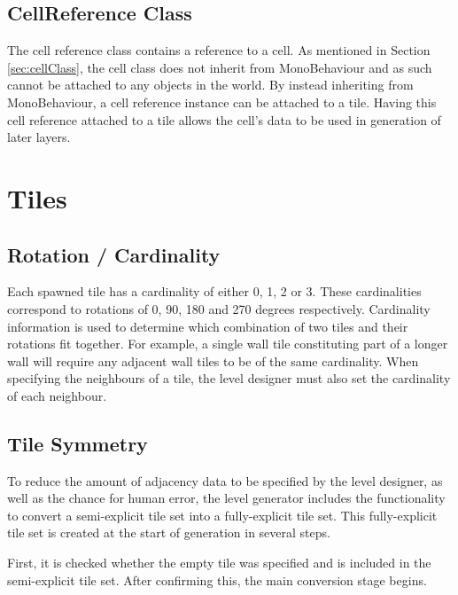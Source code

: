 
\subsection{CellReference Class}\label{sec:cellReferenceClass}
The cell reference class contains a reference to a cell. As mentioned in Section \ref{sec:cellClass}, the cell class does not inherit from MonoBehaviour and as such cannot be attached to any objects in the world. By instead inheriting from MonoBehaviour, a cell reference instance can be attached to a tile. Having this cell reference attached to a tile allows the cell's data to be used in generation of later layers.


\section{Tiles}
\subsection{Rotation / Cardinality}
Each spawned tile has a cardinality of either 0, 1, 2 or 3. These cardinalities correspond to rotations of 0, 90, 180 and 270 degrees respectively. Cardinality information is used to determine which combination of two tiles and their rotations fit together. For example, a single wall tile constituting part of a longer wall will require any adjacent wall tiles to be of the same cardinality. When specifying the neighbours of a tile, the level designer must also set the cardinality of each neighbour.



\subsection{Tile Symmetry}\label{sec:tileSymmetry}
To reduce the amount of adjacency data to be specified by the level designer, as well as the chance for human error, the level generator includes the functionality to convert a semi-explicit tile set into a fully-explicit tile set. This fully-explicit tile set is created at the start of generation in several steps.

First, it is checked whether the empty tile was specified and is included in the semi-explicit tile set. After confirming this, the main conversion stage begins.

